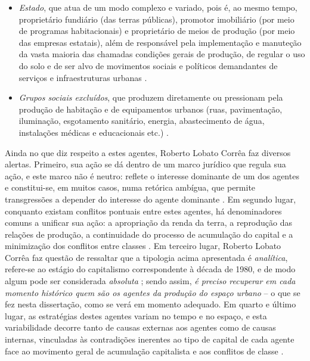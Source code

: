 \begin{itemize}
\item \textit{Estado}, que atua de um modo complexo e variado, pois é, ao mesmo tempo, proprietário fundiário (das terras públicas), promotor imobiliário (por meio de programas habitacionais) e proprietário de meios de produção (por meio das empresas estatais), além de responsável pela implementação e manuteção da vasta maioria das chamadas condições gerais de produção, de regular o uso do solo e de ser alvo de movimentos sociais e políticos demandantes de serviços e infraestruturas urbanas \cite[p.~24-29]{CORREA1985espa}.
\item \textit{Grupos sociais excluídos}, que produzem diretamente ou pressionam pela produção de habitação e de equipamentos urbanos (ruas, pavimentação, iluminação, esgotamento sanitário, energia, abastecimento de água, instalações médicas e educacionais etc.) \cite[p.~29-31]{CORREA1985espa}.
\end{itemize}

Ainda no que diz respeito a estes agentes, Roberto Lobato Corrêa faz diversos alertas. Primeiro, sua ação se dá dentro de um marco jurídico que regula sua ação, e este marco não é neutro: reflete o interesse dominante de um dos agentes e constitui-se, em muitos casos, numa retórica ambígua, que permite transgressões a depender do interesse do agente dominante \cite[p.~12]{CORREA1985espa}. Em segundo lugar, conquanto existam conflitos pontuais entre estes agentes, há denominadores comuns a unificar sua ação: a apropriação da renda da terra, a reprodução das relações de produção, a continuidade do processo de acumulação do capital e a minimização dos conflitos entre classes \cite[p.~12]{CORREA1985espa}. Em terceiro lugar, Roberto Lobato Corrêa faz questão de ressaltar que a tipologia acima apresentada é \textit{analítica}, refere-se ao estágio do capitalismo correspondente à década de 1980, e de modo algum pode ser considerada \textit{absoluta} \cite[p.~13]{CORREA1985espa}; sendo assim, \textit{é preciso recuperar em cada momento histórico quem são os agentes da produção do espaço urbano} -- o que se fez nesta dissertação, como se verá em momento adequado. Em quarto e último lugar, as estratégias destes agentes variam no tempo e no espaço, e esta variabilidade decorre tanto de causas externas aos agentes como de causas internas, vinculadas às contradições inerentes ao tipo de capital de cada agente face ao movimento geral de acumulação capitalista e aos conflitos de classe \cite[p.~13]{CORREA1985espa}.

